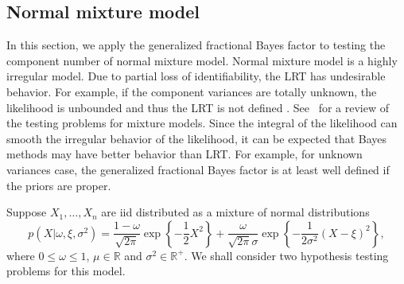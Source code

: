 \documentclass[11pt]{article}
\theoremstyle{plain}
\theoremstyle{definition}
\theoremstyle{remark}
\begin{document}

\subsection{Normal mixture model}\label{sec:mixture}
In this section, we apply the generalized fractional Bayes factor to testing the component number of normal mixture model.
Normal mixture model is a highly irregular model.
Due to partial loss of identifiability, the LRT has undesirable behavior.
For example, if the component variances are totally unknown, the likelihood is unbounded and thus the LRT is not defined \citep{Cam1990Maximum}.
See~\cite{chenjiahua2017} for a review of the testing problems for mixture models.
Since the integral of the likelihood can smooth the irregular behavior of the likelihood, it can be expected that Bayes methods may have better behavior than LRT.
For example, for unknown variances case, the generalized fractional Bayes factor is at least well defined if the priors are proper.

Suppose $X_1,\ldots,X_n$ are iid distributed as a mixture of normal distributions
\begin{equation*}
    p(X|\omega,\xi,\sigma^2)=\frac{1-\omega}{\sqrt{2\pi}}\exp\left\{-\frac{1}{2}X^2\right\}
    +\frac{\omega}{\sqrt{2\pi}\sigma}\exp\left\{ -\frac{1}{2\sigma^2}(X-\xi)^2 \right\},
\end{equation*}
where $0\leq \omega \leq 1$, $\mu\in \mathbb{R}$ and $\sigma^2\in \mathbb{R}^+$.
We shall consider two hypothesis testing problems for this model.
\end{document}
